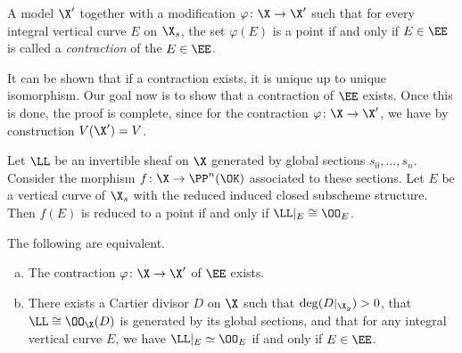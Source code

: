 \begin{definition}
    A model $\X'$ together with a modification $\varphi \colon \X \to \X'$ such that for every integral vertical curve $E$ on $\X_s$,
    the set $\varphi(E)$ is a point if and only if $E \in \EE$ is called a \textit{contraction} of the $E \in \EE$.
\end{definition}

It can be shown that if a contraction exists, it is unique up to unique isomorphism.
Our goal now is to show that a contraction of $\EE$ exists.
Once this is done, the proof is complete, since for the contraction $\varphi \colon \X \to \X'$, we have by construction $V(\X') = V$.

\begin{lemma} \label{lem:criterion_point}
    Let $\LL$ be an invertible sheaf on $\X$ generated by global sections $s_0, \dots, s_n$.
    Consider the morphism $f \colon \X \to \PP^n(\OK )$ associated to these sections.
    Let $E$ be a vertical curve of $\X_s$ with the reduced induced closed subscheme structure.
    Then $f(E)$ is reduced to a point if and only if $\LL|_E \cong \OO_E$.
\end{lemma}

\begin{proposition} \label{prop:exist_contr}
    The following are equivalent.
    \begin{enumerate}[(a)]
    \item The contraction $\varphi \colon \X \to \X'$ of $\EE$ exists. \label{prop:exist_contr_i}
    \item There exists a Cartier divisor $D$ on $\X$ such that $\deg(D|_{\X_g}) > 0$, that $\LL \cong \OO_\X(D)$ is generated
    by its global sections, and that for any integral vertical curve $E$, we have $\LL|_E \simeq \OO_E$ if and only if $E \in \EE$. \label{prop:exist_contr_ii}
    \end{enumerate}
\end{proposition}

